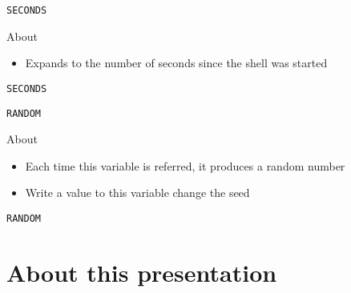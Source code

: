 \documentclass[10pt, compress, aspectratio=169]{beamer}
\begin{document}
\begin{frame}{\texttt{SECONDS}}
  \begin{exampleblock}{About}
    \begin{itemize}
      \item Expands to the number of seconds since the shell was started
    \end{itemize}
  \end{exampleblock}
\end{frame}

\begin{frame}{\texttt{SECONDS}}
  
\end{frame}

\begin{frame}{\texttt{RANDOM}}
  \begin{exampleblock}{About}
    \begin{itemize}
      \item Each time this variable is referred, it produces a random number
      \item Write a value to this variable change the seed
    \end{itemize}
  \end{exampleblock}
\end{frame}

\begin{frame}{\texttt{RANDOM}}
  
\end{frame}

\section{About this presentation}
\begin{frame}[standout]
   \begin{center}\ccbysa\end{center}
\end{frame}

\maketitle
\end{document}
